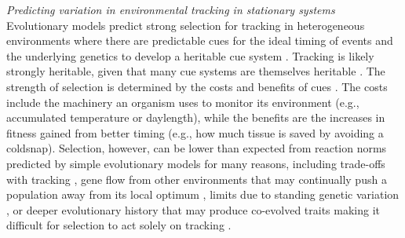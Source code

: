 \documentclass[11pt,letterpaper]{article}
\newcommand{\R}[1]{\label{}\linelabel{#1}} %
\begin{document}
\emph{Predicting variation in environmental tracking in stationary systems}\\ 
\R{plasS}Evolutionary models predict strong selection for tracking in heterogeneous environments where there are predictable cues for the ideal timing of events and the underlying genetics to develop a heritable cue system \citep{Piersma:2003wj,reed2010}. Tracking is likely strongly heritable, given that many cue systems are themselves heritable \citep[e.g.,][]{vanAsch2007gcb,Wilczek:2010ad}. The strength of selection is determined by the costs and benefits of cues \citep{donahue2015}. The costs include the machinery an organism uses to monitor its environment (e.g., accumulated temperature or daylength), while the benefits are the increases in fitness gained from better timing (e.g., how much tissue is saved by avoiding a coldsnap).  \R{r1consS}Selection, however, can be lower than expected from reaction norms predicted by simple evolutionary models for many reasons, including trade-offs with tracking \citep{Singer:2010eb,Johansson2012}, gene flow from other environments that may continually push a population away from its local optimum \citep{lenormand2002}, limits due to standing genetic variation  \citep{Franks:2007wd,ghalambor2015}, or deeper evolutionary history that may produce co-evolved traits making it difficult for selection to act solely on tracking \citep{Ackerly:2009ly}.\R{r1consE} 
\end{document}
